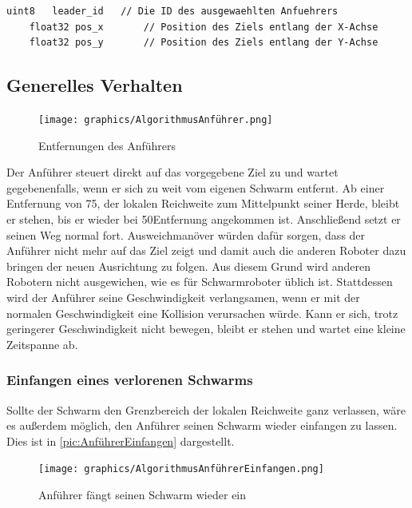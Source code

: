 \begin{lstlisting}[style=ros, title=Nachrichten-Typ: New\_Mission.msg]
	uint8	leader_id	// Die ID des ausgewaehlten Anfuehrers
	float32 pos_x		// Position des Ziels entlang der X-Achse
	float32 pos_y		// Position des Ziels entlang der Y-Achse
\end{lstlisting}

\newpage\subsection*{Generelles Verhalten}

\begin{figure}
	\texttt{[image: graphics/AlgorithmusAnführer.png]}
	\caption{Entfernungen des Anführers}
	\label{pic:AnführerReichweiten}
\end{figure}

Der Anführer steuert direkt auf das vorgegebene Ziel zu und wartet gegebenenfalls, wenn er sich zu weit vom eigenen Schwarm entfernt. Ab einer Entfernung von 75\per, der lokalen Reichweite zum Mittelpunkt seiner Herde, bleibt er stehen, bis er wieder bei 50\per Entfernung angekommen ist. Anschließend setzt er seinen Weg normal fort. Ausweichmanöver würden dafür sorgen, dass der Anführer nicht mehr auf das Ziel zeigt und damit auch die anderen Roboter dazu bringen der neuen Ausrichtung zu folgen. Aus diesem Grund wird anderen Robotern nicht ausgewichen, wie es für Schwarmroboter üblich ist. Stattdessen wird der Anführer seine Geschwindigkeit verlangsamen, wenn er mit der normalen Geschwindigkeit eine Kollision verursachen würde. Kann er sich, trotz geringerer Geschwindigkeit nicht bewegen, bleibt er stehen und wartet eine kleine Zeitspanne ab.



\subsubsection*{Einfangen eines verlorenen Schwarms}\label{subsubsec:AnführerEinfangen}
Sollte der Schwarm den Grenzbereich der lokalen Reichweite ganz verlassen, wäre es außerdem möglich, den Anführer seinen Schwarm wieder einfangen zu lassen. Dies ist in \autoref{pic:AnführerEinfangen} dargestellt.

\begin{figure}[h]
	\centering
	\texttt{[image: graphics/AlgorithmusAnführerEinfangen.png]}
	\caption{Anführer fängt seinen Schwarm wieder ein}
	\label{pic:AnführerEinfangen}
\end{figure}

